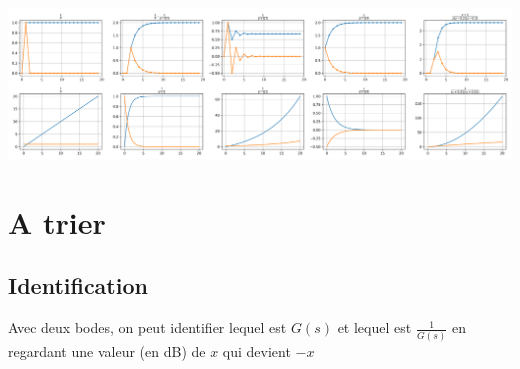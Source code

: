 \documentclass[]{article}
\begin{document}
\begin{multicols}{3}




\end{multicols}
\pagebreak
\begin{center}
\includegraphics[width=\textwidth]{Allures.png}
\end{center}


\section{A trier}
\subsection{Identification}
Avec deux bodes, on peut identifier lequel est $G(s)$ et lequel est $\frac{1}{G(s)}$ en regardant une valeur (en dB) de $x$ qui devient $-x$
\end{document}
